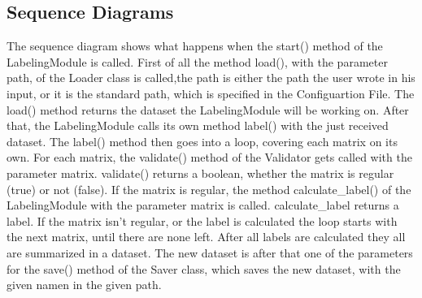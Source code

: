 \documentclass[parskip=full]{scrartcl}
\begin{document}
\subsection{Sequence Diagrams}
The sequence diagram shows what happens when the start() method of the LabelingModule is called.
First of all the method load(), with the parameter path, of the Loader class is called,the path is either the path the user wrote in his input, or it is the standard path, which is specified in the Configuartion File.
The load() method returns the dataset the LabelingModule will be working on.
After that, the LabelingModule calls its own method label() with the just received dataset.
The label() method then goes into a loop, covering each matrix on its own.
For each matrix, the validate() method of the Validator gets called with the parameter matrix. validate() returns a boolean, whether the matrix is regular (true) or not (false).
If the matrix is regular, the method calculate\_label() of the LabelingModule with the parameter matrix is called. calculate\_label returns a \gls{label}.
If the matrix isn't regular, or the \gls{label} is calculated the loop starts with the next matrix, until there are none left.
After all \glspl{label} are calculated they all are summarized in a dataset.
The new dataset is after that one of the parameters for the save() method of the Saver class, which saves the new dataset, with the given namen in the given path.

\newpage
\begin{figure}[h]
\begin{center}

\label{Activity Diagrams}
\end{center}
\end{figure}
\newpage
\end{document}
